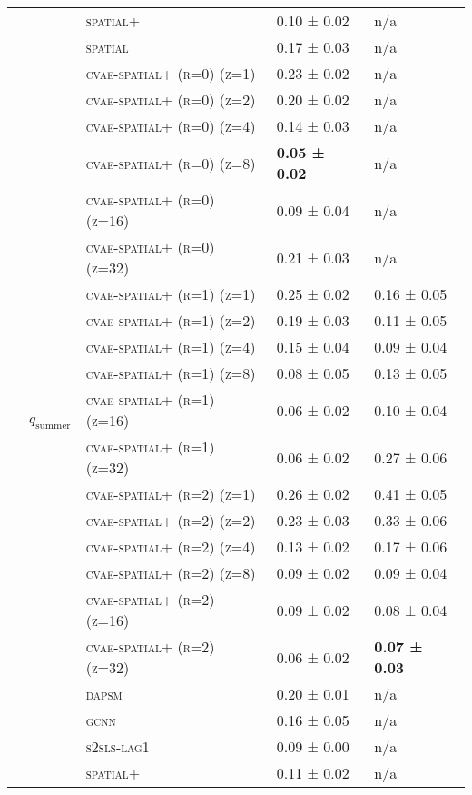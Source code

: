 \documentclass{article}
\begin{document}
\begin{table}[!tbp]
\begin{tabular}{lllll}
 &  & \textsc{spatial+} & 0.10 ± { 0.02} & n/a \\
 &  & \textsc{spatial} & 0.17 ± { 0.03} & n/a \\
\cline{2-5}
 & \multirow[t]{23}{*}{$q_{\text{summer}}$} & \textsc{cvae-spatial+ (r=0) (z=1)} & 0.23 ± { 0.02} & n/a \\
 &  & \textsc{cvae-spatial+ (r=0) (z=2)} & 0.20 ± { 0.02} & n/a \\
 &  & \textsc{cvae-spatial+ (r=0) (z=4)} & 0.14 ± { 0.03} & n/a \\
 &  & \textsc{cvae-spatial+ (r=0) (z=8)} & \bf 0.05 ± { 0.02} & n/a \\
 &  & \textsc{cvae-spatial+ (r=0) (z=16)} & 0.09 ± { 0.04} & n/a \\
 &  & \textsc{cvae-spatial+ (r=0) (z=32)} & 0.21 ± { 0.03} & n/a \\
 &  & \textsc{cvae-spatial+ (r=1) (z=1)} & 0.25 ± { 0.02} & 0.16 ± { 0.05} \\
 &  & \textsc{cvae-spatial+ (r=1) (z=2)} & 0.19 ± { 0.03} & 0.11 ± { 0.05} \\
 &  & \textsc{cvae-spatial+ (r=1) (z=4)} & 0.15 ± { 0.04} & 0.09 ± { 0.04} \\
 &  & \textsc{cvae-spatial+ (r=1) (z=8)} & 0.08 ± { 0.05} & 0.13 ± { 0.05} \\
 &  & \textsc{cvae-spatial+ (r=1) (z=16)} & 0.06 ± { 0.02} & 0.10 ± { 0.04} \\
 &  & \textsc{cvae-spatial+ (r=1) (z=32)} & 0.06 ± { 0.02} & 0.27 ± { 0.06} \\
 &  & \textsc{cvae-spatial+ (r=2) (z=1)} & 0.26 ± { 0.02} & 0.41 ± { 0.05} \\
 &  & \textsc{cvae-spatial+ (r=2) (z=2)} & 0.23 ± { 0.03} & 0.33 ± { 0.06} \\
 &  & \textsc{cvae-spatial+ (r=2) (z=4)} & 0.13 ± { 0.02} & 0.17 ± { 0.06} \\
 &  & \textsc{cvae-spatial+ (r=2) (z=8)} & 0.09 ± { 0.02} & 0.09 ± { 0.04} \\
 &  & \textsc{cvae-spatial+ (r=2) (z=16)} & 0.09 ± { 0.02} & 0.08 ± { 0.04} \\
 &  & \textsc{cvae-spatial+ (r=2) (z=32)} & 0.06 ± { 0.02} & \bf 0.07 ± { 0.03} \\
 &  & \textsc{dapsm} & 0.20 ± { 0.01} & n/a \\
 &  & \textsc{gcnn} & 0.16 ± { 0.05} & n/a \\
 &  & \textsc{s2sls-lag1} & 0.09 ± { 0.00} & n/a \\
 &  & \textsc{spatial+} & 0.11 ± { 0.02} & n/a \\

\end{tabular}
\end{table}
\end{document}
